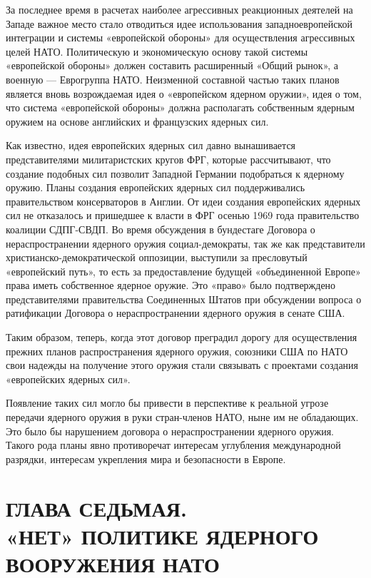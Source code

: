 \documentclass[12pt, a4paper, openany]{book}
\begin{document}
	За последнее время в расчетах наиболее агрессивных реакционных деятелей на Западе важное место стало отводиться идее использования западноевропейской интеграции и системы «европейской обороны» для осуществления агрессивных целей НАТО. Политическую и экономическую основу такой системы «европейской обороны» должен составить расширенный «Общий рынок», а военную — Еврогруппа НАТО. Неизменной составной частью таких планов является вновь возрождаемая идея о «европейском ядерном оружии», идея о том, что система «европейской обороны» должна располагать собственным ядерным оружием на основе английских и французских ядерных сил.
	
	Как известно, идея европейских ядерных сил давно вынашивается представителями милитаристских кругов ФРГ, которые рассчитывают, что создание подобных сил позволит Западной Германии подобраться к ядерному оружию. Планы создания европейских ядерных сил поддерживались правительством консерваторов в Англии. От идеи создания европейских ядерных сил не отказалось и пришедшее к власти в ФРГ осенью 1969 года правительство коалиции СДПГ-СВДП. Во время обсуждения в бундестаге Договора о нераспространении ядерного оружия социал-демократы, так же как представители христианско-демократической оппозиции, выступили за пресловутый «европейский путь», то есть за предоставление будущей «объединенной Европе» права иметь собственное ядерное оружие. Это «право» было подтверждено представителями правительства Соединенных Штатов при обсуждении вопроса о ратификации Договора о нераспространении ядерного оружия в сенате США.
	
	Таким образом, теперь, когда этот договор преградил дорогу для осуществления прежних планов распространения ядерного оружия, союзники США по НАТО свои надежды на получение этого оружия стали связывать с проектами создания «европейских ядерных сил».
	
	Появление таких сил могло бы привести в перспективе к реальной угрозе передачи ядерного оружия в руки стран-членов НАТО, ныне им не обладающих. Это было бы нарушением договора о нераспространении ядерного оружия. Такого рода планы явно противоречат интересам углубления международной разрядки, интересам укрепления мира и безопасности в Европе.
	
	
						\newpage
	\section[Глава седьмая. «НЕТ» ПОЛИТИКЕ ЯДЕРНОГО ВООРУЖЕНИЯ НАТО]{\center ГЛАВА СЕДЬМАЯ.\\ \textbf{«НЕТ» ПОЛИТИКЕ ЯДЕРНОГО ВООРУЖЕНИЯ НАТО}}	
\end{document}

